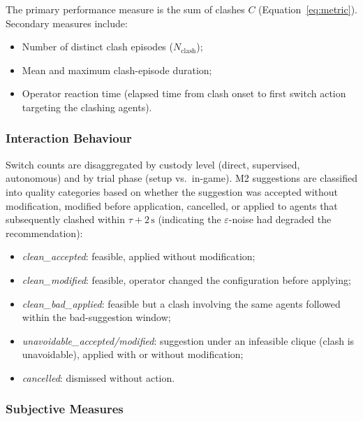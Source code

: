 \documentclass[10pt]{article}
\theoremstyle{definition}
\begin{document}
The primary performance measure is the sum of clashes $C$ (Equation~\ref{eq:metric}). Secondary measures include:
\begin{itemize}[noitemsep]
  \item Number of distinct clash episodes ($N_{\mathrm{clash}}$);
  \item Mean and maximum clash-episode duration;
  \item Operator reaction time (elapsed time from clash onset to first switch action targeting the clashing agents).
\end{itemize}

\subsubsection{Interaction Behaviour}

Switch counts are disaggregated by custody level (direct, supervised, autonomous) and by trial phase (setup vs.\ in-game). M2 suggestions are classified into quality categories based on whether the suggestion was accepted without modification, modified before application, cancelled, or applied to agents that subsequently clashed within $\tau + 2\,\mathrm{s}$ (indicating the $\varepsilon$-noise had degraded the recommendation):
\begin{itemize}[noitemsep]
  \item \textit{clean\_accepted}: feasible, applied without modification;
  \item \textit{clean\_modified}: feasible, operator changed the configuration before applying;
  \item \textit{clean\_bad\_applied}: feasible but a clash involving the same agents followed within the bad-suggestion window;
  \item \textit{unavoidable\_accepted/modified}: suggestion under an infeasible clique (clash is unavoidable), applied with or without modification;
  \item \textit{cancelled}: dismissed without action.
\end{itemize}

\subsubsection{Subjective Measures}
\end{document}
